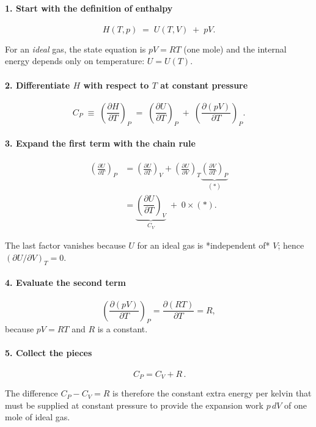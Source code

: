 \documentclass[12pt]{article}
\theoremstyle{definition} %
\theoremstyle{plain} %
\begin{document}
\paragraph{1.  Start with the definition of enthalpy}
\[
  H(T,p)\;=\;U(T,V)\;+\;pV.
\]

For an \emph{ideal} gas, the state equation is \(pV = RT\) (one mole) and
the internal energy depends only on temperature: \(U = U(T)\).

\bigskip
\paragraph{2.  Differentiate \(H\) with respect to \(T\) at constant pressure}
\[
  C_P \;\equiv\;
  \left(\frac{\partial H}{\partial T}\right)_P
  \;=\;
  \left(\frac{\partial U}{\partial T}\right)_P
  \;+\;
  \left(\frac{\partial (pV)}{\partial T}\right)_P .
\]

\bigskip
\paragraph{3.  Expand the first term with the chain rule}
\[
  \begin{aligned}
  \left(\frac{\partial U}{\partial T}\right)_P
      &=\left(\frac{\partial U}{\partial T}\right)_V
        +\left(\frac{\partial U}{\partial V}\right)_T
         \underbrace{\left(\frac{\partial V}{\partial T}\right)_P}_{\displaystyle (*)}\\[6pt]
      &=\underbrace{\left(\dfrac{\partial U}{\partial T}\right)_V}_{C_V}\;
        +\;
        0\times(*) .
  \end{aligned}
\]

The last factor vanishes because \(U\) for an ideal gas is *independent of*
\(V\); hence \(\left(\partial U/\partial V\right)_T = 0\).

\bigskip
\paragraph{4.  Evaluate the second term}
\[
  \left(\frac{\partial (pV)}{\partial T}\right)_P
  =\frac{\partial (RT)}{\partial T}
  = R,
\]
because \(pV = RT\) and \(R\) is a constant.

\bigskip
\paragraph{5.  Collect the pieces}
\[
  \boxed{\,C_P
    = C_V + R\,}.
\]

The difference \(C_P - C_V = R\) is therefore the constant extra energy
per kelvin that must be supplied at constant pressure to provide the
expansion work \(p\,dV\) of one mole of ideal gas.
\end{document}
